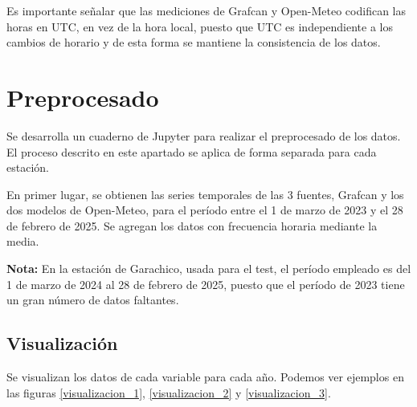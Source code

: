 Es importante señalar que las mediciones de Grafcan y Open-Meteo codifican las horas en UTC, en vez de la hora local, puesto que UTC es independiente a los cambios de horario
y de esta forma se mantiene la consistencia de los datos.

\section{Preprocesado}

Se desarrolla un cuaderno de Jupyter para realizar el preprocesado de los datos. El proceso descrito en este apartado
se aplica de forma separada para cada estación.

En primer lugar, se obtienen las series temporales de las 3 fuentes, Grafcan y los dos modelos de Open-Meteo, para el período entre el 1 de marzo de 2023 y el 28 de febrero de 2025.
Se agregan los datos con frecuencia horaria mediante la media. 

\textbf{Nota:} En la estación de Garachico, usada para el test, el período empleado es del 1 de marzo de 2024 al 28 de febrero de 2025, puesto que el período de 2023 tiene 
un gran número de datos faltantes.

\subsection{Visualización}
Se visualizan los datos de cada variable para cada año. Podemos ver ejemplos en las figuras \ref{visualizacion_1}, \ref{visualizacion_2} y \ref{visualizacion_3}.

